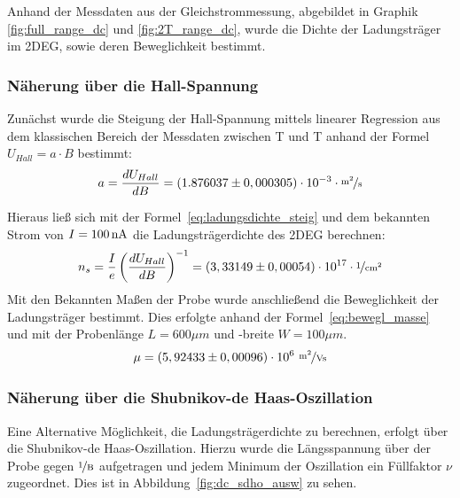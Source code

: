 

Anhand der Messdaten aus der Gleichstrommessung, abgebildet in Graphik \ref{fig:full_range_dc} und \ref{fig:2T_range_dc}, wurde die Dichte der Ladungsträger im 2DEG, sowie deren Beweglichkeit bestimmt.

\subsubsection{Näherung über die Hall-Spannung}
\label{ch:naeherung_hall}

Zunächst wurde die Steigung der Hall-Spannung mittels linearer Regression aus dem klassischen Bereich der Messdaten zwischen \unit[-2]{T} und \unit[2]{T} anhand der Formel $ U_{Hall}=a\cdot B $  
bestimmt:
\begin{equation}
	a=\d{U_{Hall}}{B} = (1.876037 \pm 0,000305)\cdot10^{-3} \cdot  \unitfrac{m^2}{s}
\end{equation} %

Hieraus ließ sich mit der Formel~\eqref{eq:ladungsdichte_steig} und dem bekannten Strom von $I=\unit[100]{nA}$ die Ladungsträgerdichte des 2DEG berechnen: 
\begin{equation}
	n_s= \frac{I}{e}\left({\d{U_{Hall}}{B}}\right)^{-1}=(3,33149 \pm 0,00054) \cdot 10^{17}\cdot \unitfrac{1}{cm^2}
\end{equation} %
Mit den Bekannten Maßen der Probe wurde anschließend die Beweglichkeit der Ladungsträger bestimmt. Dies erfolgte anhand der Formel~\ref{eq:bewegl_masse} und mit der Probenlänge $L=600\mu m$ und -breite $W=100\mu m$.\\
\begin{equation}
\mu= (5,92433\pm 0,00096) \cdot 10^6 ~ \unitfrac{m^2}{Vs} %
\end{equation}


 
\subsubsection{Näherung über die Shubnikov-de Haas-Oszillation}
\label{ch:naeherung_sdho}

Eine Alternative Möglichkeit, die Ladungsträgerdichte zu berechnen, erfolgt über die Shubnikov-de Haas-Oszillation. Hierzu wurde die Längsspannung über der Probe 
 gegen $\unitfrac{1}{B}$ aufgetragen und jedem Minimum der Oszillation ein Füllfaktor $\nu$ zugeordnet. Dies ist in Abbildung~\ref{fig:dc_sdho_ausw} zu sehen. 
 
